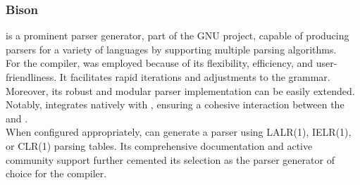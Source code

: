 \subsubsection{Bison}

\parserGen{} is a prominent parser generator, part of the GNU project, capable of
producing parsers for a variety of languages by supporting multiple parsing
algorithms. \\

For the \lang{} compiler, \parserGen{} was employed because of its flexibility,
efficiency, and user-friendliness. It facilitates rapid iterations and adjustments to
the grammar. Moreover, its robust and modular parser implementation can be easily
extended. Notably, \parserGen{} integrates natively with \lexerGen{}, ensuring a
cohesive interaction between the \lexer{} and \parser{}. \\

When configured appropriately, \parserGen{} can generate a \textit{\parserType{}}
parser using LALR(1), IELR(1), or CLR(1) parsing tables. Its comprehensive
documentation and active community support further cemented its selection as the
parser generator of choice for the \lang{} compiler.

